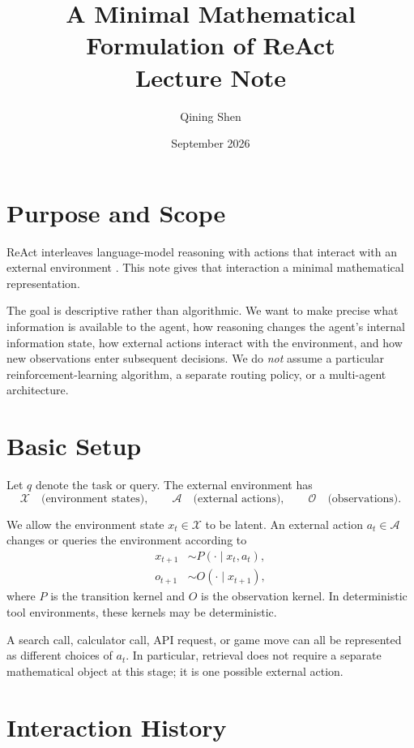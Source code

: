 \documentclass[11pt]{article}
\title{A Minimal Mathematical Formulation of ReAct\\\large Lecture Note}
\author{Qining Shen}
\date{September 2026}
\begin{document}
\maketitle

\section{Purpose and Scope}

ReAct interleaves language-model reasoning with actions that interact with an external environment \cite{yao2023react}. This note gives that interaction a minimal mathematical representation.

The goal is descriptive rather than algorithmic. We want to make precise what information is available to the agent, how reasoning changes the agent's internal information state, how external actions interact with the environment, and how new observations enter subsequent decisions. We do \emph{not} assume a particular reinforcement-learning algorithm, a separate routing policy, or a multi-agent architecture.

\section{Basic Setup}

Let \(q\) denote the task or query. The external environment has
\[
\mathcal{X}
\quad \text{(environment states)},\qquad
\mathcal{A}
\quad \text{(external actions)},\qquad
\mathcal{O}
\quad \text{(observations)}.
\]

We allow the environment state \(x_t\in\mathcal{X}\) to be latent. An external action \(a_t\in\mathcal{A}\) changes or queries the environment according to
\begin{align}
    x_{t+1} &\sim P(\cdot\mid x_t,a_t), \label{eq:transition}\\
    o_{t+1} &\sim O(\cdot\mid x_{t+1}), \label{eq:observation}
\end{align}
where \(P\) is the transition kernel and \(O\) is the observation kernel. In deterministic tool environments, these kernels may be deterministic.

A search call, calculator call, API request, or game move can all be represented as different choices of \(a_t\). In particular, retrieval does not require a separate mathematical object at this stage; it is one possible external action.

\section{Interaction History}
\end{document}
